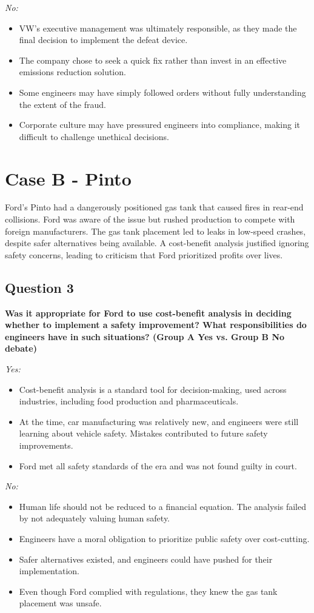 \documentclass{article}
\begin{document}
\textit{No:}
\begin{itemize}
    \item VW’s executive management was ultimately responsible, as they made the final decision to implement the defeat device.
    \item The company chose to seek a quick fix rather than invest in an effective emissions reduction solution.
    \item Some engineers may have simply followed orders without fully understanding the extent of the fraud.
    \item Corporate culture may have pressured engineers into compliance, making it difficult to challenge unethical decisions.
\end{itemize}

\pagebreak
\section*{Case B - Pinto}
Ford’s Pinto had a dangerously positioned gas tank that caused fires in rear-end collisions. Ford was aware of the issue but rushed production to compete with foreign manufacturers. The gas tank placement led to leaks in low-speed crashes, despite safer alternatives being available. A cost-benefit analysis justified ignoring safety concerns, leading to criticism that Ford prioritized profits over lives.

\subsection*{Question 3}
\textbf{Was it appropriate for Ford to use cost-benefit analysis in deciding whether to implement a safety improvement? What responsibilities do engineers have in such situations? (Group A Yes vs. Group B No debate)}

\textit{Yes:}
\begin{itemize}
    \item Cost-benefit analysis is a standard tool for decision-making, used across industries, including food production and pharmaceuticals.
    \item At the time, car manufacturing was relatively new, and engineers were still learning about vehicle safety. Mistakes contributed to future safety improvements.
    \item Ford met all safety standards of the era and was not found guilty in court.
\end{itemize}

\textit{No:}
\begin{itemize}
    \item Human life should not be reduced to a financial equation. The analysis failed by not adequately valuing human safety.
    \item Engineers have a moral obligation to prioritize public safety over cost-cutting.
    \item Safer alternatives existed, and engineers could have pushed for their implementation.
    \item Even though Ford complied with regulations, they knew the gas tank placement was unsafe.
\end{itemize}
\end{document}
